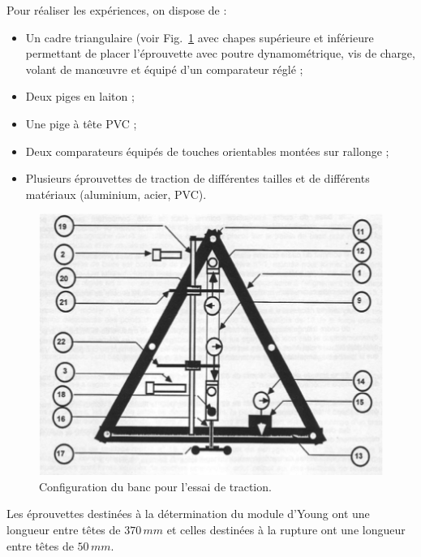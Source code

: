\documentclass[lecture.tex]{subfiles}
\begin{document}
    Pour réaliser les expériences, on dispose de :
    \begin{itemize}[label = , font = \tiny]
      \item Un cadre triangulaire (voir Fig.~\ref{Fig_banc} avec chapes supérieure et inférieure permettant de placer l'éprouvette avec poutre dynamométrique, vis de charge, volant de manœuvre et équipé d'un comparateur réglé ;
      \item Deux piges en laiton ;
      \item Une pige à tête PVC ;
      \item Deux comparateurs équipés de touches orientables montées sur rallonge ;
      \item Plusieurs éprouvettes de traction de différentes tailles et de différents matériaux (aluminium, acier, PVC).
    \end{itemize}
    \begin{figure}[h!]
      \centering
      \includegraphics[scale=0.8]{Fig_banc.png}
      \caption{Configuration du banc pour l'essai de traction.}
      \label{Fig_banc}
    \end{figure}

\medskip

Les éprouvettes destinées à la détermination du module d'Young ont une longueur entre têtes de $370\, mm$ et celles destinées à la rupture ont une longueur entre têtes de $50\, mm$.
\end{document}
